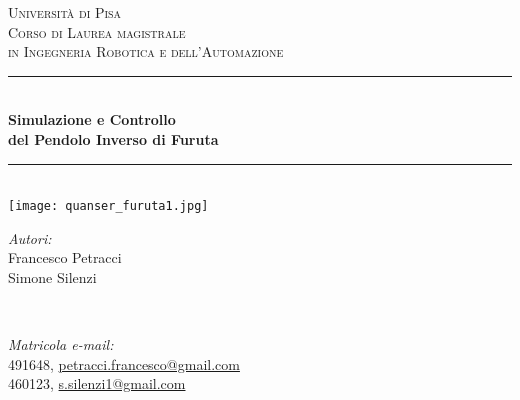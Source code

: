 
\begin{titlepage}
	\centering
	\vspace*{2 cm}
	\textsc{\Large Universit\`a di Pisa }\\[0.5 cm]							%
	\textsc{\large Corso di Laurea magistrale \\ 
		\vspace*{3mm} in Ingegneria Robotica e dell'Automazione}\\[1 cm]		%
	\rule{\linewidth}{0.2 mm} \\
	{ \Large{\textbf{Simulazione e Controllo \\ del Pendolo Inverso di Furuta}}}\\
	
	\rule{\linewidth}{0.2 mm} \\[2.5 cm]
	
	\texttt{[image: quanser\_furuta1.jpg]}
	
	\vspace*{2 cm}
	\begin{minipage}{0.48\textwidth}
		\begin{flushleft}
			\textit{Autori:}\\
			Francesco Petracci\\
			Simone Silenzi
		\end{flushleft}
	\end{minipage}~
	\begin{minipage}{0.48\textwidth}
		\begin{flushright}
			\textit{Matricola e-mail:}\\		
			491648, \href{mailto:petracci.francesco@gmail.com}{petracci.francesco@gmail.com} \\
			460123, \href{mailto:s.silenzi1@gmail.com}{s.silenzi1@gmail.com}
		\end{flushright}
	\end{minipage}\\[2 cm]
	
	
	
\end{titlepage}
\newpage